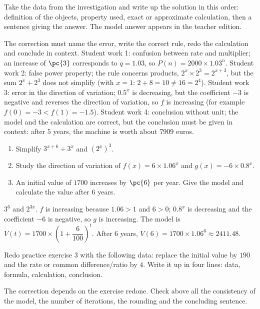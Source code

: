 \begin{example}
Take the data from the investigation and write up the solution in this order: definition of the objects, property used, exact or approximate calculation, then a sentence giving the answer. The model answer appears in the teacher edition.
\end{example}
\begin{solution}The correction must name the error, write the correct rule, redo the calculation and conclude in context. Student work 1: confusion between rate and multiplier; an increase of $\pc{3}$ corresponds to $q=\num{1,03}$, so $P(n)=\num{2000}\times\num{1,03}^n$. Student work 2: false power property; the rule concerns products, $2^x\times2^3=2^{x+3}$, but the sum $2^x+2^3$ does not simplify (with $x=1$: $2+8=10\neq16=2^4$). Student work 3: error in the direction of variation; $\num{0,5}^x$ is decreasing, but the coefficient $-3$ is negative and reverses the direction of variation, so $f$ is increasing (for example $f(0)=-3<f(1)=-\num{1,5}$). Student work 4: conclusion without unit; the model and the calculation are correct, but the conclusion must be given in context: after $5$ years, the machine is worth about $\num{7909}$ euros.\end{solution}

\begin{exercise}[essential]
\begin{enumerate}\item Simplify $3^{x+6}\div3^x$ and $(2^x)^3$.\item Study the direction of variation of $f(x)=6\times\num{1,06}^x$ and $g(x)=-6\times\num{0,8}^x$.\item An initial value of $1700$ increases by $\pc{6}$ per year. Give the model and calculate the value after $6$ years.\end{enumerate}
\end{exercise}
\begin{solution}$3^6$ and $2^{3x}$. $f$ is increasing because $\num{1,06}>1$ and $6>0$; $\num{0,8}^x$ is decreasing and the coefficient $-6$ is negative, so $g$ is increasing. The model is $V(t)=1700\times\left(1+\dfrac{6}{100}\right)^t$. After $6$ years, $V(6)=1700\times\num{1,06}^6\approx\num{2411,48}$.\end{solution}


\begin{homework}Redo practice exercise 3 with the following data: replace the initial value by $190$ and the rate or common difference/ratio by $4$. Write it up in four lines: data, formula, calculation, conclusion.\end{homework}
\begin{solution}The correction depends on the exercise redone. Check above all the consistency of the model, the number of iterations, the rounding and the concluding sentence.\end{solution}

